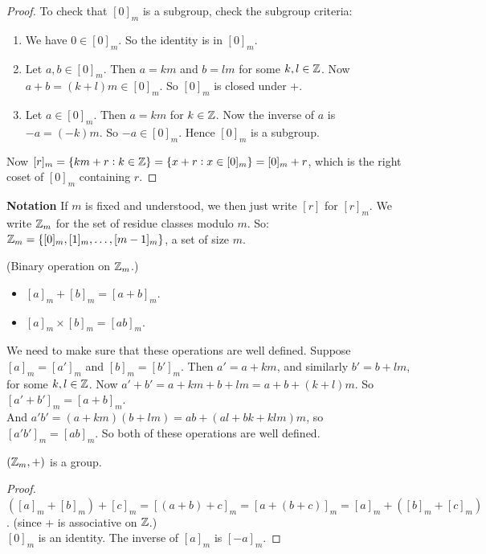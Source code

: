 \begin{proof}
To check that $[0]_m$ is a subgroup, check the subgroup criteria:\begin{enumerate}
\item We have $ 0 \in [0]_m$. So the identity is in $[0]_m$.
\item Let $a,b \in [0]_m$. Then $a = km$ and $b = lm$ for some $k,l \in \mathbb{Z}$. Now $a+b = (k+l)m\in [0]_m$. So $[0]_m$ is closed under $+$.
\item Let $a \in [0]_m$. Then $a = km$ for $ k \in \mathbb{Z}$. Now the inverse of $a$ is $-a = (-k)m$. So $-a \in [0]_m$. Hence $[0]_m$ is a subgroup. 	
\end{enumerate}

Now $[r]_m = \{km + r : k \in \mathbb{Z}\} = \{x + r : x \in [0]_m\} = [0]_m + r$, which is the right coset of $[0]_m$ containing $r$. 
\end{proof}\vspace*{10pt}


\textbf{Notation} If $m$ is fixed and understood, we then just write $[r]$ for $[r]_m$. We write $\mathbb{Z} _m$ for the set of residue classes modulo $m$. So:\\
 $\mathbb{Z} _m = \{[0]_m,[1]_m,\dots,[m-1]_m\}$, a set of size $m$.\\
 
 
\begin{definition}(Binary operation on $\mathbb{Z}_m$.)\begin{itemize}
\item[] $[a]_m + [b]_m = [a+b]_m$. 
\item[] $[a]_m \times [b]_m = [ab]_m$.
\end{itemize}
\end{definition}

We need to make sure that these operations are well defined. Suppose $[a]_m = [a']_m$ and $[b]_m = [b']_m$. Then $a' = a + km$, and similarly $b' = b + lm$, for some $k,l \in \mathbb{Z}$. Now $a' + b' = a + km + b + lm = a +b + (k+l)m$. So $[a'+b']_m = [a+b]_m$.\\

 And $a'b' = (a+km)(b + lm) = ab + (al+ bk + klm)m$, so $[a'b']_m = [ab]_m$. So both of these operations are well defined.\\
 
 
\begin{proposition} $(\mathbb{Z}_m,+)$ is a group.	
\end{proposition}

\begin{proof}
$([a]_m + [b]_m) + [c]_m = [(a+b) + c]_m = [a+(b+c)]_m = [a]_m + ([b]_m + [c]_m)$. (since + is associative on $\mathbb{Z}$.)\\
 $[0]_m$ is an identity. The inverse of $[a]_m$ is $[-a]_m$.
\end{proof}

